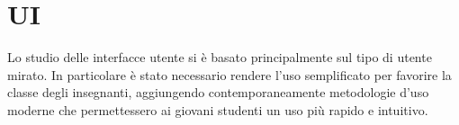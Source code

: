\section{UI}
\label{sec:ui}

Lo studio delle interfacce utente si è basato principalmente sul tipo di utente mirato.
In particolare è stato necessario rendere l'uso semplificato per favorire la
classe degli insegnanti, aggiungendo contemporaneamente metodologie d'uso moderne
che permettessero ai giovani studenti un uso più rapido e intuitivo.